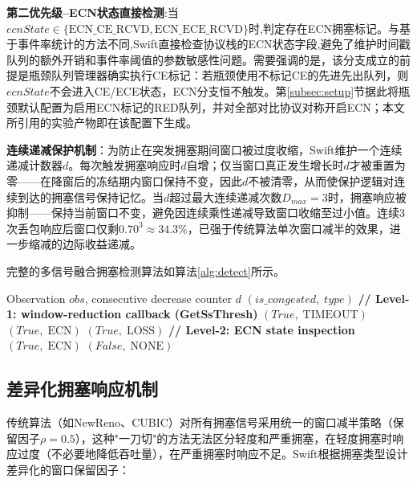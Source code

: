 \documentclass[10pt,twocolumn]{article}
\begin{document}
\textbf{第二优先级--ECN状态直接检测}:当$ecnState \in \{\text{ECN\_CE\_RCVD}, \text{ECN\_ECE\_RCVD}\}$时,判定存在ECN拥塞标记。与基于事件率统计的方法不同,Swift直接检查协议栈的ECN状态字段,避免了维护时间戳队列的额外开销和事件率阈值的参数敏感性问题。需要强调的是，该分支成立的前提是瓶颈队列管理器确实执行CE标记：若瓶颈使用不标记CE的先进先出队列，则$ecnState$不会进入CE/ECE状态，ECN分支恒不触发。第\ref{subsec:setup}节据此将瓶颈默认配置为启用ECN标记的RED队列，并对全部对比协议对称开启ECN；本文所引用的实验产物即在该配置下生成。

\textbf{连续递减保护机制}：为防止在突发拥塞期间窗口被过度收缩，Swift维护一个连续递减计数器$d$。每次触发拥塞响应时$d$自增；仅当窗口真正发生增长时$d$才被重置为零——在降窗后的冻结期内窗口保持不变，因此$d$不被清零，从而使保护逻辑对连续到达的拥塞信号保持记忆。当$d$超过最大连续递减次数$D_{max} = 3$时，拥塞响应被抑制——保持当前窗口不变，避免因连续乘性递减导致窗口收缩至过小值。连续3次丢包响应后窗口仅剩$0.70^3 \approx 34.3\%$，已强于传统算法单次窗口减半的效果，进一步缩减的边际收益递减。

完整的多信号融合拥塞检测算法如算法\ref{alg:detect}所示。

\begin{algorithm}[htbp]
\caption{Multi-Signal Fusion Congestion Detection}
\label{alg:detect}
\small
\begin{algorithmic}[1]
\REQUIRE Observation $obs$, consecutive decrease counter $d$
\ENSURE $(is\_congested, \; type)$
\STATE \textbf{// Level-1: window-reduction callback (GetSsThresh)}
        \RETURN $(True, \; \text{TIMEOUT})$
        \RETURN $(True, \; \text{ECN})$
    \ELSE
        \RETURN $(True, \; \text{LOSS})$
    \ENDIF
\ENDIF
\STATE \textbf{// Level-2: ECN state inspection}
    \RETURN $(True, \; \text{ECN})$
\ENDIF
\RETURN $(False, \; \text{NONE})$
\end{algorithmic}
\end{algorithm}

\subsection{差异化拥塞响应机制}

传统算法（如NewReno、CUBIC）对所有拥塞信号采用统一的窗口减半策略（保留因子$\rho=0.5$），这种"一刀切"的方法无法区分轻度和严重拥塞，在轻度拥塞时响应过度（不必要地降低吞吐量），在严重拥塞时响应不足。Swift根据拥塞类型设计差异化的窗口保留因子：
\end{document}
